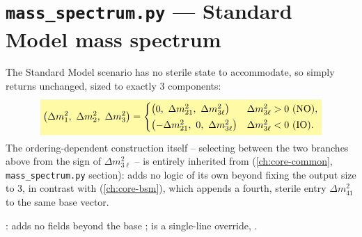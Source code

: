 \section{\texttt{mass\_spectrum.py} --- Standard Model mass spectrum}


\begin{theorybox}
The Standard Model scenario has no sterile state to accommodate, so
 simply returns
 unchanged, sized to exactly 3
components:
\begin{equation}
  \keyresult{\bigl(\Delta m^2_1,\ \Delta m^2_2,\ \Delta m^2_3\bigr)
  =\begin{cases}
      \bigl(0,\ \Delta m^2_{21},\ \Delta m^2_{3\ell}\bigr) & \Delta m^2_{3\ell} > 0\ \text{(NO)},\\[2pt]
      \bigl(-\Delta m^2_{21},\ 0,\ \Delta m^2_{3\ell}\bigr) & \Delta m^2_{3\ell} < 0\ \text{(IO)}.
    \end{cases}}
\end{equation}
The ordering-dependent construction itself -- selecting between the two
branches above from the sign of $\Delta m^2_{3\ell}$ -- is entirely
inherited from  (\cref{ch:core-common},
\texttt{mass\_spectrum.py} section):  adds no
logic of its own beyond fixing the output size to 3, in contrast with
 (\cref{ch:core-bsm}), which appends a fourth,
sterile entry $\Delta m^2_{41}$ to the same base vector.
\end{theorybox}

\begin{implbox}
: adds no fields beyond
the base ;  is a
single-line override, .
\end{implbox}
